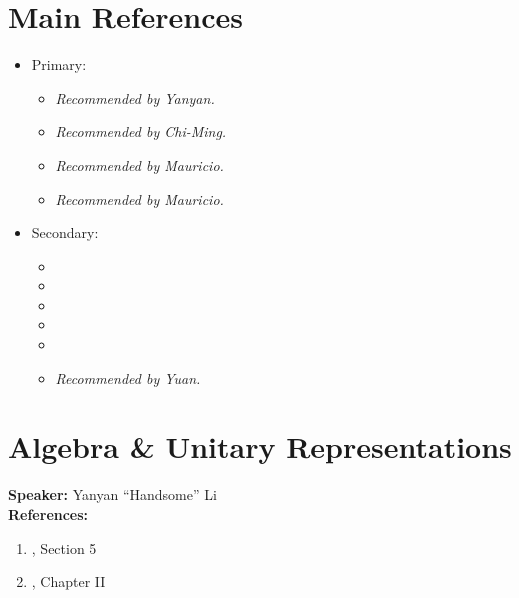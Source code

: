 \documentclass[a4paper
	,10pt
]{article}
\newcommand{\speaker}[1]{\noindent\textbf{Speaker:} #1}
\newcommand{\references}[1]{\noindent\textbf{References:} #1}
\begin{document}
\section{Main References}
\raggedright
\begin{itemize}
\item Primary:
	\begin{itemize}[itemsep=\parskip]%
	\item[\cite{Argyres:1996abc}]
		\par \textit{Recommended by Yanyan.}
		
	\item[\cite{Tachikawa:2018sae}]
		\par \textit{Recommended by Chi-Ming.}
		
	\item[\cite{Figueroa-OFarrill:2001xbd}]
		\par \textit{Recommended by Mauricio.}
		
	\item[\cite{VanProeyen:1999ni}]
		\par \textit{Recommended by Mauricio.}
		
	\end{itemize}
\item Secondary:
	\begin{itemize}
	\item[\cite{Freedman:2012zz}]
	
	\item[\cite{Wess:1992cp}]
	
	\item[\cite{Hori:2003ic}]
	
	\item[\cite{figueroa2015majorana}]
	
	\item[\cite{Zhou:2018abc}]
	
	\item[\cite{Kapranov:2015nft}]
		\par \textit{Recommended by Yuan.}
		
	\end{itemize}
\end{itemize}
\justifying

\section{Algebra \& Unitary Representations}
	\speaker{Yanyan ``Handsome'' Li}\\
	\references{
	\begin{enumerate}[noitemsep,topsep=0pt]
	\item \textcite{Argyres:1996abc}, Section 5
	\item \textcite{Wess:1992cp}, Chapter II
	\end{enumerate}
	}\vspace{.5\baselineskip}
	
\end{document}
